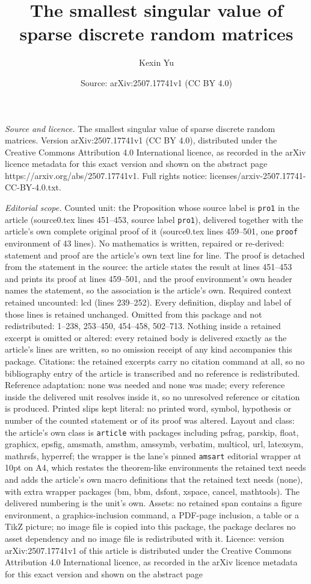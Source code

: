 \documentclass[10pt,a4paper]{amsart}
\title[The smallest singular value of sparse discrete random matric]{The smallest singular value of sparse discrete random matrices}
\author{Kexin Yu}
\date{Source: arXiv:2507.17741v1 (CC BY 4.0)}
\begin{document}
\maketitle

\noindent\emph{Source and licence.} The smallest singular value of sparse discrete random matrices. Version arXiv:2507.17741v1 (CC BY 4.0), distributed under the Creative Commons Attribution 4.0 International licence, as recorded in the arXiv licence metadata for this exact version and shown on the abstract page https://arxiv.org/abs/2507.17741v1. Full rights notice: licenses/arxiv-2507.17741-CC-BY-4.0.txt.\par\smallskip

\noindent\textit{Editorial scope.} Counted unit: the Proposition whose source label is \texttt{pro1} in the article (source0.tex lines 451--453, source label \texttt{pro1}), delivered together with the article's own complete original proof of it (source0.tex lines 459--501, one \texttt{proof} environment of 43 lines). No mathematics is written, repaired or re-derived: statement and proof are the article's own text line for line. The proof is detached from the statement in the source: the article states the result at lines 451--453 and prints its proof at lines 459--501, and the proof environment's own header names the statement, so the association is the article's own. Required context retained uncounted: lcd (lines 239--252). Every definition, display and label of those lines is retained unchanged. Omitted from this package and not redistributed: 1--238, 253--450, 454--458, 502--713. Nothing inside a retained excerpt is omitted or altered: every retained body is delivered exactly as the article's lines are written, so no omission receipt of any kind accompanies this package. Citations: the retained excerpts carry no citation command at all, so no bibliography entry of the article is transcribed and no reference is redistributed. Reference adaptation: none was needed and none was made; every reference inside the delivered unit resolves inside it, so no unresolved reference or citation is produced. Printed slips kept literal: no printed word, symbol, hypothesis or number of the counted statement or of its proof was altered. Layout and class: the article's own class is \texttt{article} with packages including psfrag, parskip, float, graphicx, epsfig, amsmath, amsthm, amssymb, verbatim, multicol, url, latexsym, mathrsfs, hyperref; the wrapper is the lane's pinned \texttt{amsart} editorial wrapper at 10pt on A4, which restates the theorem-like environments the retained text needs and adds the article's own macro definitions that the retained text needs (none), with extra wrapper packages (bm, bbm, dsfont, xspace, cancel, mathtools). The delivered numbering is the unit's own. Assets: no retained span contains a figure environment, a graphics-inclusion command, a PDF-page inclusion, a table or a TikZ picture; no image file is copied into this package, the package declares no asset dependency and no image file is redistributed with it. Licence: version arXiv:2507.17741v1 of this article is distributed under the Creative Commons Attribution 4.0 International licence, as recorded in the arXiv licence metadata for this exact version and shown on the abstract page 
\end{document}
